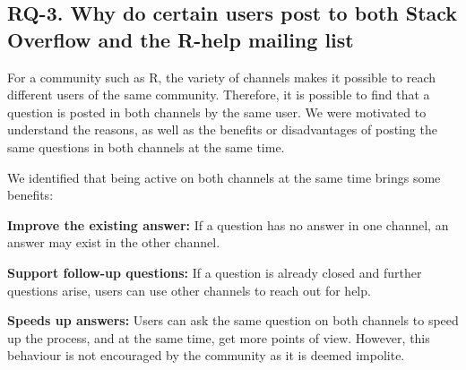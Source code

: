 
\subsection{RQ-3. Why do certain users post to both Stack Overflow and the R-help mailing list}

    For a community such as R, the variety of channels makes it possible to reach different users of the same community.
    Therefore, it is possible to find that a question is posted in both channels by the same user.
    We were motivated to understand the reasons, as well as the benefits or disadvantages of posting the same questions in both channels at the same time.

    We identified that being active on both channels at the same time brings some benefits:
    \begin{packed_enum}
        \item \textbf{Improve the existing answer:} If a question has no answer in one channel, an answer may exist in the other channel.
        \item \textbf{Support follow-up questions:} If a question is already closed and further questions arise, users can use other channels to reach out for help.
        \item \textbf{Speeds up answers:} Users can ask the same question on both channels to speed up the process, and at the same time, get more points of view. However, this behaviour is not encouraged by the community as it is deemed impolite.
    \end{packed_enum}

